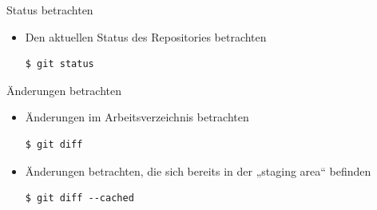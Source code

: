 \begin{frame}[fragile]{Status betrachten}
  \begin{itemize}
    \item Den aktuellen Status des Repositories betrachten
    \begin{lstlisting}
$ git status
    \end{lstlisting}
  \end{itemize}
\end{frame}

\begin{frame}[fragile]{Änderungen betrachten}
  \begin{itemize}
    \item Änderungen im Arbeitsverzeichnis betrachten
    \begin{lstlisting}
$ git diff
    \end{lstlisting}
    \item Änderungen betrachten, die sich bereits in der „staging area“ befinden
    \begin{lstlisting}
$ git diff --cached
    \end{lstlisting}
  \end{itemize}
\end{frame}

